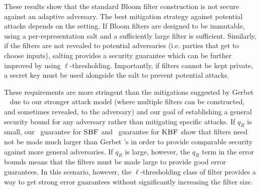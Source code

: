 These results show that the standard Bloom filter construction is not secure
against an adaptive adversary. The best mitigation strategy against potential
attacks depends on the setting. If Bloom filters are designed to be immutable,
using a per-representation salt and a sufficiently large filter is sufficient.
Similarly, if the filters are not revealed to potential adversaries (i.e.
parties that get to choose inputs), salting provides a security guarantee which
can be further improved by using $\ell$-thresholding. Importantly, if filters
cannot be kept private, a secret key must be used alongside the salt to prevent
potential attacks.

These requirements are more stringent than the mitigations suggested by Gerbet
\etal~\cite{gerbet2015power} due to our stronger attack model (where multiple
filters can be constructed, and sometimes revealed, to the adversary) and our
goal of establishing a general security bound for any adversary rather than
mitigating specific attacks. If $q_R$ is small, our \erreps\ guarantee for
$\textnormal{\textsc{SBF}}$ and \errep\ guarantee for $\textnormal{\textsc{KBF}}$ show that filters need not be made much
larger than Gerbet \etal's in order to provide comparable security against more
general adversaries. If $q_R$ is large, however, the $q_R$ term in the error
bounds means that the filters must be made large to provide good error
guarantees. In this scenario, however, the $\ell$-thresholding class of filter
provides a way to get strong error guarantees without significantly increasing
the filter size.

